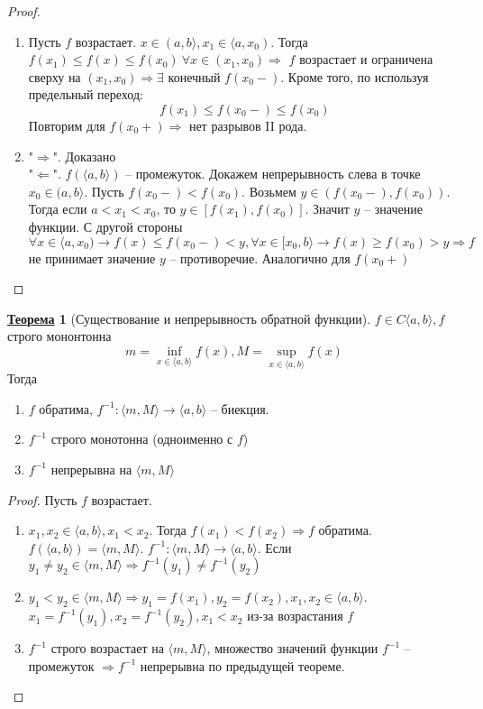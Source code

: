 \documentclass[12pt]{article}
\newenvironment{MyList}[1][4pt]{
  \begin{enumerate}[1.]
  \setlength{\parskip}{0pt}
  \setlength{\itemsep}{#1}
}{       
  \end{enumerate}
}
\def\SO{\Rightarrow}     %
\theoremstyle{definition} %
\newtheorem{Thm}{\underline{Теорема}}[subsection] %
\theoremstyle{plain} %
\theoremstyle{remark} %
\begin{document}
\begin{proof}
    \begin{MyList}
        \item Пусть $f$ возрастает. $x \in (a, b\rangle, x_1 \in \langle a, x_0)$. Тогда $f(x_1) \leqslant f(x) \leqslant f(x_0) \ \forall x \in (x_1, x_0) \SO$
        $f$ возрастает и ограничена сверху на $(x_1, x_0) \SO \exists$ конечный $f(x_0-)$. Кроме того, по используя предельный переход:
        \[f(x_1) \leqslant f(x_0-) \leqslant f(x_0)\]
        Повторим для $f(x_0+) \SO$ нет разрывов II рода.
        
        \item "$\SO$". Доказано \\
        "$\Leftarrow$". $f(\langle a, b\rangle)$ -- промежуток. Докажем непрерывность слева в точке $x_0 \in (a, b\rangle$. Пусть $f(x_0-) < f(x_0)$.
        Возьмем $y \in (f(x_0 -), f(x_0))$. Тогда если $a < x_1 < x_0$, то $y \in [f(x_1), f(x_0)]$. Значит $y$ -- значение функции.
        С другой стороны $\forall x \in \langle a, x_0) \to f(x) \leqslant f(x_0-) < y, \forall x \in [x_0, b\rangle \to f(x) \geqslant f(x_0) > y \SO f$ не принимает значение $y$ -- противоречие.
        Аналогично для $f(x_0+)$     
    \end{MyList}
\end{proof}

\begin{Thm}[Существование и непрерывность обратной функции]
    $f \in C\langle a, b\rangle, f$ строго мононтонна
    \[m = \inf_{x \in \langle a, b\rangle} f(x), M = \sup_{x \in \langle a, b\rangle} f(x)\]
    Тогда
    \begin{MyList}
        \item $f$ обратима, $f^{-1} : \langle m, M\rangle \to \langle a, b\rangle$ -- биекция.
        \item $f^{-1}$ строго монотонна (одноименно с $f$)
        \item $f^{-1}$  непрерывна на $\langle m, M\rangle$  
    \end{MyList}
\end{Thm}

\begin{proof}
    Пусть $f$ возрастает.
    \begin{MyList}
        \item $x_1, x_2 \in \langle a, b\rangle, x_1 < x_2$. Тогда $f(x_1) < f(x_2) \SO f$ обратима. \\
        $f(\langle a, b\rangle) = \langle m, M\rangle$. $f^{-1} : \langle m, M\rangle \to \langle a, b\rangle$. Если $y_1 \neq y_2 \in \langle m, M\rangle \SO f^{-1}(y_1) \neq f^{-1}(y_2)$       

        \item $y_1 < y_2 \in \langle m, M\rangle \SO y_1 = f(x_1), y_2 = f(x_2), x_1, x_2 \in \langle a, b\rangle$. $x_1 = f^{-1}(y_1), x_2 = f^{-1}(y_2), x_1 < x_2$ из-за возрастания $f$
        \item $f^{-1}$ строго возрастает на $\langle m, M\rangle$, множество значений функции $f^{-1}$ -- промежуток $\SO f^{-1}$ непрерывна по предыдущей теореме.    
    \end{MyList}
\end{proof}
\end{document}
